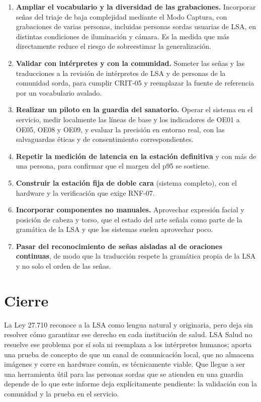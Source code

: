 \begin{enumerate}
  \item \textbf{Ampliar el vocabulario y la diversidad de las grabaciones.} Incorporar señas del triaje de baja complejidad mediante el Modo Captura, con grabaciones de varias personas, incluidas personas sordas usuarias de LSA, en distintas condiciones de iluminación y cámara. Es la medida que más directamente reduce el riesgo de sobreestimar la generalización.
  \item \textbf{Validar con intérpretes y con la comunidad.} Someter las señas y las traducciones a la revisión de intérpretes de LSA y de personas de la comunidad sorda, para cumplir CRIT-05 y reemplazar la fuente de referencia por un vocabulario avalado.
  \item \textbf{Realizar un piloto en la guardia del sanatorio.} Operar el sistema en el servicio, medir localmente las líneas de base y los indicadores de OE01 a OE05, OE08 y OE09, y evaluar la precisión en entorno real, con las salvaguardas éticas y de consentimiento correspondientes.
  \item \textbf{Repetir la medición de latencia en la estación definitiva} y con más de una persona, para confirmar que el margen del p95 se sostiene.
  \item \textbf{Construir la estación fija de doble cara} (sistema completo), con el hardware y la verificación que exige RNF-07.
  \item \textbf{Incorporar componentes no manuales.} Aprovechar expresión facial y posición de cabeza y torso, que el estado del arte señala como parte de la gramática de la LSA y que los sistemas suelen aprovechar poco.
  \item \textbf{Pasar del reconocimiento de señas aisladas al de oraciones continuas}, de modo que la traducción respete la gramática propia de la LSA y no solo el orden de las señas.
\end{enumerate}

\section{Cierre}\label{sec:concl-cierre}

La Ley 27.710 reconoce a la LSA como lengua natural y originaria, pero deja sin resolver cómo garantizar ese derecho en cada institución de salud. LSA Salud no resuelve ese problema por sí sola ni reemplaza a los intérpretes humanos; aporta una prueba de concepto de que un canal de comunicación local, que no almacena imágenes y corre en hardware común, es técnicamente viable. Que llegue a ser una herramienta útil para las personas sordas que se atienden en una guardia depende de lo que este informe deja explícitamente pendiente: la validación con la comunidad y la prueba en el servicio.
